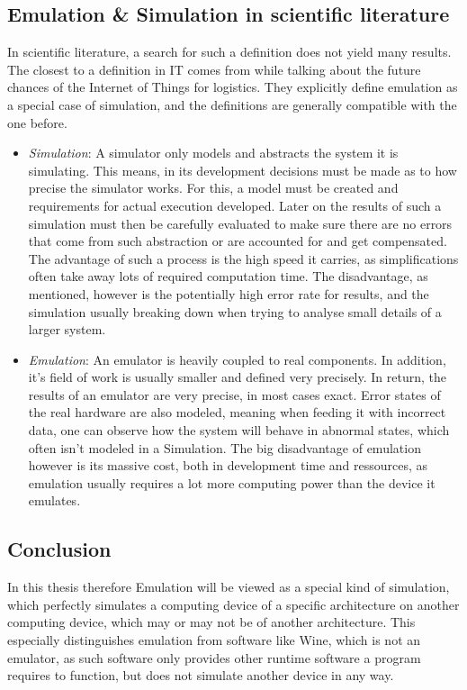 \subsection{Emulation \& Simulation in scientific literature}
In scientific literature, a search for such a definition does not yield many results.
The closest to a definition in IT comes from 
while talking about the future chances of the Internet of Things for logistics\cite{definition_iot}.
They explicitly define emulation as a special case of simulation,
and the definitions are generally compatible with the one before.
\begin{itemize}
    \item \emph{Simulation}: A simulator only models and abstracts the system it is simulating.
    This means, in its development decisions must be made as to how precise the simulator works.
    For this, a model must be created and requirements for actual execution developed.
    Later on the results of such a simulation must then be carefully evaluated to make sure
    there are no errors that come from such abstraction
    or are accounted for and get compensated.
    The advantage of such a process is the high speed it carries,
    as simplifications often take away lots of required computation time.
    The disadvantage, as mentioned, however is the potentially high error rate for results,
    and the simulation usually breaking down when trying to analyse small details of a larger system\cite{definition_iot}.
    \item \emph{Emulation}: An emulator is heavily coupled to real components.
    In addition, it's field of work is usually smaller and defined very precisely.
    In return, the results of an emulator are very precise, in most cases exact.
    Error states of the real hardware are also modeled, meaning when feeding it with incorrect data,
    one can observe how the system will behave in abnormal states, which often isn't modeled in a Simulation.
    The big disadvantage of emulation however is its massive cost,
    both in development time and ressources,
    as emulation usually requires a lot more computing power than the device it emulates\cite{definition_iot}.
\end{itemize}

\subsection{Conclusion}
In this thesis therefore Emulation will be viewed as a special kind of simulation,
which perfectly simulates a computing device of a specific architecture
on another computing device, which may or may not be of another architecture.
This especially distinguishes emulation from software like Wine, which is not an emulator,
as such software only provides other runtime software a program requires to function, but does not simulate another device in any way\cite{wine}.

